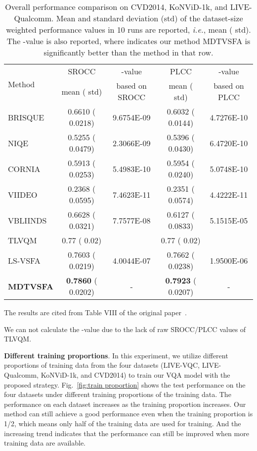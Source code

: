 \documentclass[twocolumn]{svjour3}          \smartqed  \usepackage{graphicx}
\begin{document}
\begin{table*}[!hbt]
    \centering
    \caption{Overall performance comparison on CVD2014, KoNViD-1k, and LIVE-Qualcomm. Mean and standard deviation (std) of the dataset-size weighted performance values in 10 runs are reported, \textit{i.e.}, mean ( std). The -value is also reported, where  indicates our method MDTVSFA is significantly better than the method in that row.}
    \label{tab:overall performance}

    \begin{small}
    
\begin{tabular}{lcccc}
    \toprule
     \multirow{2}{*}{Method} & SROCC & -value & PLCC & -value\\
     & mean ( std) & based on SROCC & mean ( std) & based on PLCC \\
    \midrule
    BRISQUE~\citep{mittal2012no} & 0.6610 ( 0.0218) & 9.6754E-09 & 0.6032 ( 0.0144) & 4.7276E-10\\
    NIQE~\citep{mittal2013making} & 0.5255 ( 0.0479)  & 2.3066E-09 & 0.5396 ( 0.0430) & 6.4720E-10 \\
    CORNIA~\citep{ye2012unsupervised} &  0.5913 ( 0.0253) & 5.4983E-10 & 0.5954 ( 0.0240) & 5.0748E-10\\
    VIIDEO~\citep{mittal2016completely} &  0.2368 ( 0.0595) & 7.4623E-11 & 0.2351 ( 0.0574) & 4.4222E-11 \\
    VBLIINDS~\citep{saad2014blind} &  0.6628 ( 0.0321) & 7.7577E-08 & 0.6127 ( 0.0833) & 5.1515E-05 \\
    TLVQM~\citep{korhonen2019two} & 0.77 ( 0.02) &  & 0.77 ( 0.02) & \\
    \midrule
    LS-VSFA &  0.7603 ( 0.0219) & 4.0044E-07 &  0.7662 ( 0.0238) & 1.9500E-06 \\
    \textbf{MDTVSFA} & \textbf{0.7860} ( 0.0202) & - & \textbf{0.7923} ( 0.0207) & -\\
    \bottomrule
    \end{tabular}
\vspace{1mm}
    
    The results are cited from Table VIII of the original paper~\citep{korhonen2019two}. 
    
    We can not calculate the -value due to the lack of raw SROCC/PLCC values of TLVQM.
    \end{small}
\end{table*}

\textbf{Different training proportions}.
In this experiment, we utilize different proportions of training data from the four datasets (LIVE-VQC, LIVE-Qualcomm, KoNViD-1k, and CVD2014) to train our VQA model with the proposed strategy. 
Fig.~\ref{fig:train proportion} shows the test performance on the four datasets under different training proportions of the training data. 
The performance on each dataset increases as the training proportion increases. 
Our method can still achieve a good performance even when the training proportion is 1/2, which means only half of the training data are used for training. 
And the increasing trend indicates that the performance can still be improved when more training data are available.
\end{document}
